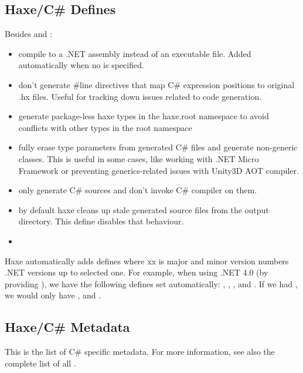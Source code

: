 \subsection{Haxe/C\# Defines}
\label{target-cs-defines}

Besides  and :

\begin{itemize}
	\item {} compile to a .NET assembly instead of an executable file. Added automatically when no  is specified.
	\item {} don't generate \#line directives that map C\# expression positions to original .hx files. Useful for tracking down issues related to code generation.
	\item {} generate package-less haxe types in the haxe.root namespace to avoid conflicts with other types in the root namespace
	\item {} fully erase type parameters from generated C\# files and generate non-generic classes. This is useful in some cases, like working with .NET Micro Framework or preventing generics-related issues with Unity3D AOT compiler.
	\item {} only generate C\# sources and don't invoke C\# compiler on them.
	\item {} by default haxe cleans up stale generated source files from the output directory. This define disables that behaviour.
	\item {}
\end{itemize}
	
Haxe automatically adds  defines where xx is major and minor version numbers .NET versions up to selected one. For example, when using .NET 4.0 (by providing ), we have the following defines set automatically: , , ,  and . If we had , we would only have ,  and .

\subsection{Haxe/C\# Metadata}
\label{target-cs-metadata}

This is the list of C\# specific metadata. For more information, see also the complete list of all .

